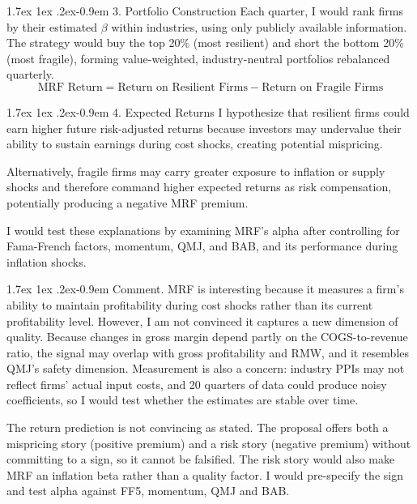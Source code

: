 \documentclass[11pt]{article}
\makeatletter
\renewcommand\paragraph{\@startsection{paragraph}{4}{0pt}%
  {1.7ex \@plus 1ex \@minus .2ex}{-0.9em}%
  {\normalfont\bfseries\normalsize\color{psink}}}
\makeatother
\begin{document}
\paragraph{3. Portfolio Construction}
Each quarter, I would rank firms by their estimated $\beta$ within industries, using only publicly available information. The strategy would buy the top 20\% (most resilient) and short the bottom 20\% (most fragile), forming value-weighted, industry-neutral portfolios rebalanced quarterly.
\[
\text{MRF Return} = \text{Return on Resilient Firms} - \text{Return on Fragile Firms}
\]

\paragraph{4. Expected Returns}
I hypothesize that resilient firms could earn higher future risk-adjusted returns because investors may undervalue their ability to sustain earnings during cost shocks, creating potential mispricing.

Alternatively, fragile firms may carry greater exposure to inflation or supply shocks and therefore command higher expected returns as risk compensation, potentially producing a negative MRF premium.

I would test these explanations by examining MRF's alpha after controlling for Fama-French factors, momentum, QMJ, and BAB, and its performance during inflation shocks.


\paragraph{Comment.}
MRF is interesting because it measures a firm's ability to maintain profitability during cost shocks rather than its current profitability level. However, I am not convinced it captures a new dimension of quality. Because changes in gross margin depend partly on the COGS-to-revenue ratio, the signal may overlap with gross profitability and RMW, and it resembles QMJ's safety dimension. Measurement is also a concern: industry PPIs may not reflect firms' actual input costs, and 20 quarters of data could produce noisy coefficients, so I would test whether the estimates are stable over time.

The return prediction is not convincing as stated. The proposal offers both a mispricing story (positive premium) and a risk story (negative premium) without committing to a sign, so it cannot be falsified. The risk story would also make MRF an inflation beta rather than a quality factor. I would pre-specify the sign and test alpha against FF5, momentum, QMJ and BAB.
\end{document}
